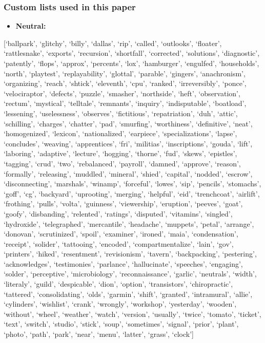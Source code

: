\documentclass{clv3}
\providecommand{\tightlist}{%
  \setlength{\itemsep}{0pt}\setlength{\parskip}{0pt}}
\begin{document}
\hypertarget{custom-lists-used-in-this-paper}{%
\subsubsection{\texorpdfstring{Custom lists used in this paper
\label{app:custom}}{Custom lists used in this paper }}\label{custom-lists-used-in-this-paper}}

\begin{itemize}
\tightlist
\item
  \textbf{Neutral:}
\end{itemize}

{[}`ballpark', `glitchy', `billy', `dallas', `rip', `called',
`outlooks', `floater', `rattlesnake', `exports', `recursion',
`shortfall', `corrected', `solutions', `diagnostic', `patently',
`flops', `approx', `percents', `lox', `hamburger', `engulfed',
`households', `north', `playtest', `replayability', `glottal',
`parable', `gingers', `anachronism', `organizing', `reach', `shtick',
`eleventh', `cpu', `ranked', `irreversibly', `ponce', `velociraptor',
`defects', `puzzle', `smasher', `northside', `heft', `observation',
`rectum', `mystical', `telltale', `remnants', `inquiry', `indisputable',
`boatload', `lessening', `uselessness', `observes', `fictitious',
`repatriation', `duh', `attic', `schilling', `charges', `chatter',
`pad', `smurfing', `worthiness', `definitive', `neat', `homogenized',
`lexicon', `nationalized', `earpiece', `specializations', `lapse',
`concludes', `weaving', `apprentices', `fri', `militias',
`inscriptions', `gouda', `lift', `laboring', `adaptive', `lecture',
`hogging', `thorne', `fud', `skews', `epistles', `tagging', `crud',
`two', `rebalanced', `payroll', `damned', `approve', `reason',
`formally', `releasing', `muddled', `mineral', `shied', `capital',
`nodded', `escrow', `disconnecting', `marshals', `winamp', `forceful',
`lowes', `sip', `pencils', `stomachs', `goff', `cg', `backyard',
`uprooting', `merging', `helpful', `eid', `trenchcoat', `airlift',
`frothing', `pulls', `volta', `guinness', `viewership', `eruption',
`peeves', `goat', `goofy', `disbanding', `relented', `ratings',
`disputed', `vitamins', `singled', `hydroxide', `telegraphed',
`mercantile', `headache', `muppets', `petal', `arrange', `donovan',
`scrutinized', `spoil', `examiner', `ironed', `maia', `condensation',
`receipt', `solider', `tattooing', `encoded', `compartmentalize',
`lain', `gov', `printers', `hiked', `resentment', `revisionism',
`tavern', `backpacking', `pestering', `acknowledges', `testimonies',
`parlance', `hallucinate', `speeches', `engaging', `solder',
`perceptive', `microbiology', `reconnaissance', `garlic', `neutrals',
`width', `literaly', `guild', `despicable', `dion', `option',
`transistors', `chiropractic', `tattered', `consolidating', `olds',
`garmin', `shift', `granted', `intramural', `allie', `cylinders',
`wishlist', `crank', `wrongly', `workshop', `yesterday', `wooden',
`without', `wheel', `weather', `watch', `version', `usually', `twice',
`tomato', `ticket', `text', `switch', `studio', `stick', `soup',
`sometimes', `signal', `prior', `plant', `photo', `path', `park',
`near', `menu', `latter', `grass', `clock'{]}
\end{document}
